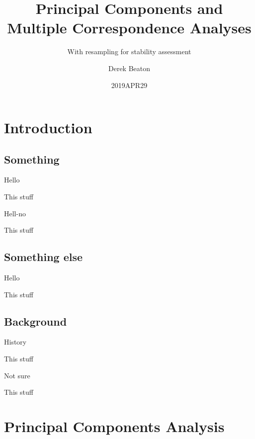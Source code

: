 \documentclass[
  ignorenonframetext,
]{beamer}
\title{Principal Components and Multiple Correspondence Analyses}
\subtitle{With resampling for stability assessment}
\author{Derek Beaton}
\date{2019APR29}
\institute{RRI RTC}
\begin{document}
\frame{\titlepage}

\hypertarget{introduction}{%
\section{Introduction}\label{introduction}}

\hypertarget{something}{%
\subsection{Something}\label{something}}

\begin{frame}{Hello}
\protect\hypertarget{hello}{}

This stuff

\end{frame}

\begin{frame}{Hell-no}
\protect\hypertarget{hell-no}{}

This stuff

\end{frame}

\hypertarget{something-else}{%
\subsection{Something else}\label{something-else}}

\begin{frame}{Hello}
\protect\hypertarget{hello-1}{}

This stuff

\end{frame}

\hypertarget{background}{%
\subsection{Background}\label{background}}

\begin{frame}{History}
\protect\hypertarget{history}{}

This stuff

\end{frame}

\begin{frame}{Not sure}
\protect\hypertarget{not-sure}{}

This stuff

\end{frame}

\hypertarget{principal-components-analysis}{%
\section{Principal Components
Analysis}\label{principal-components-analysis}}
\end{document}
